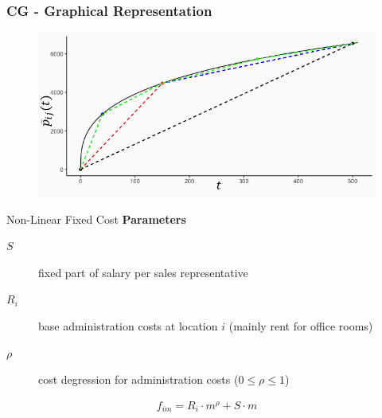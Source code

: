 \begin{frame}
\frametitle{CG - Graphical Representation}
\begin{center}
\begin{figure}
    \centering
    \includegraphics[width=\linewidth]{plot8.png}
\end{figure}
\end{center}
\end{frame}

\begin{frame}{Non-Linear Fixed Cost}
\textbf{Parameters}
    \begin{description}
	  \item[$S$]  fixed part of salary per sales representative
  \item[$R_i$] base administration costs at location $i$ (mainly rent for office rooms) 
  \item[$\rho$] cost degression for administration costs ($0\leq \rho \leq 1$)
\end{description}
\begin{align}
    f_{im} = R_i \cdot m^\rho + S \cdot m
\end{align}
\end{frame}


